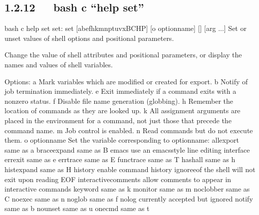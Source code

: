 \documentclass[letterpaper,12pt,english]{sphinxmanual}
\begin{document}
\subsection{1.2.12   bash \sphinxhyphen{}c “help set”}
\label{\detokenize{001software/001install/linux:bash-c-help-set}}
\begin{sphinxVerbatim}[commandchars=\\\{\}]
\PYGZdl{} bash \PYGZhy{}c \PYGZdq{}help set\PYGZdq{}
set: set [\PYGZhy{}abefhkmnptuvxBCHP] [\PYGZhy{}o option\PYGZhy{}name] [\PYGZhy{}\PYGZhy{}] [arg ...]
    Set or unset values of shell options and positional parameters.

    Change the value of shell attributes and positional parameters, or
    display the names and values of shell variables.

    Options:
      \PYGZhy{}a  Mark variables which are modified or created for export.
      \PYGZhy{}b  Notify of job termination immediately.
      \PYGZhy{}e  Exit immediately if a command exits with a non\PYGZhy{}zero status.
      \PYGZhy{}f  Disable file name generation (globbing).
      \PYGZhy{}h  Remember the location of commands as they are looked up.
      \PYGZhy{}k  All assignment arguments are placed in the environment for a
          command, not just those that precede the command name.
      \PYGZhy{}m  Job control is enabled.
      \PYGZhy{}n  Read commands but do not execute them.
      \PYGZhy{}o option\PYGZhy{}name
          Set the variable corresponding to option\PYGZhy{}name:
              allexport    same as \PYGZhy{}a
              braceexpand  same as \PYGZhy{}B
              emacs        use an emacs\PYGZhy{}style line editing interface
              errexit      same as \PYGZhy{}e
              errtrace     same as \PYGZhy{}E
              functrace    same as \PYGZhy{}T
              hashall      same as \PYGZhy{}h
              histexpand   same as \PYGZhy{}H
              history      enable command history
              ignoreeof    the shell will not exit upon reading EOF
              interactive\PYGZhy{}comments
                           allow comments to appear in interactive commands
              keyword      same as \PYGZhy{}k
              monitor      same as \PYGZhy{}m
              noclobber    same as \PYGZhy{}C
              noexec       same as \PYGZhy{}n
              noglob       same as \PYGZhy{}f
              nolog        currently accepted but ignored
              notify       same as \PYGZhy{}b
              nounset      same as \PYGZhy{}u
              onecmd       same as \PYGZhy{}t

\end{sphinxVerbatim}
\end{document}
